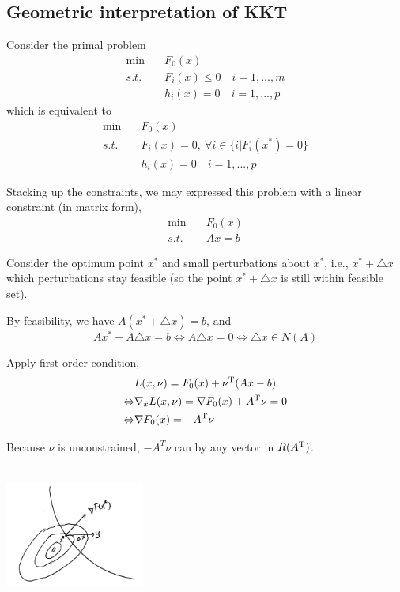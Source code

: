 \subsection{Geometric interpretation of KKT}
Consider the primal problem
\begin{align*}
\min \quad & F_0(x)\\
s.t. \quad & F_i(x)\leq 0\quad i=1,...,m\\
&h_i(x) = 0\quad i=1,...,p
\end{align*}
which is equivalent to 
\begin{align*}
\min \quad & F_0(x)\\
s.t. \quad & F_i(x)= 0,\ \forall i\in\{i | F_i(x^*)=0\}\\
&h_i(x) = 0\quad i=1,...,p
\end{align*}

Stacking up the constraints, we may expressed this problem with a linear constraint (in matrix form),
\begin{align*}
\min \quad & F_0(x)\\
s.t. \quad & Ax = b
\end{align*}

Consider the optimum point $x^*$ and small perturbations about $x^*$, i.e., $x^*+\triangle x$ which perturbations stay feasible (so the point $x^*+\triangle x$ is still within feasible set).

By feasibility, we have $A(x^*+\triangle x) = b$, and
$$Ax^* + A\triangle x = b\Leftrightarrow A\triangle x = 0\Leftrightarrow \triangle x \in N(A)$$

Apply first order condition,
\begin{align*}
&L(x,\nu) = F_0(x) +\nu^{{\rm T}}(Ax-b)\\
\Leftrightarrow & \nabla_xL(x,\nu) = \nabla F_0(x) + A^{{\rm T}}\nu  = 0\\
\Leftrightarrow & \nabla F_0(x) = -A^{{\rm T}}\nu
\end{align*}

Because $\nu$ is unconstrained, $-A^{T}\nu$ can by any vector in $R(A^{{\rm T}})$.



\begin{marginfigure}
	\centering
	\includegraphics[width=1.8in,height=1.8in]{figures/ch10/figure1204_3.png}
\end{marginfigure}

